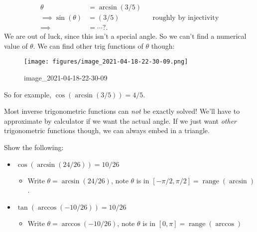 \begin{solution}

\begin{align*}
\theta &= \arcsin(3/5) \\
\implies \sin(\theta) &= (3/5) && \text{roughly by injectivity} \\
\implies &= \cdots ?
.\end{align*}
We are out of luck, since this isn't a special angle. So we can't find a
numerical value of \(\theta\). We can find other trig functions of
\(\theta\) though:

\begin{figure}
\centering
\texttt{[image: figures/image\_2021-04-18-22-30-09.png]}
\caption{image\_2021-04-18-22-30-09}
\end{figure}

So for example, \(\cos(\arcsin(3/5)) = 4/5\).

\end{solution}

\begin{remark}

Most inverse trigonometric functions can \emph{not} be exactly solved!
We'll have to approximate by calculator if we want the actual angle. If
we just want \emph{other} trigonometric functions though, we can always
embed in a triangle.

\end{remark}

\begin{example}

Show the following:

\begin{itemize}
\tightlist
\item
  \(\cos(\arcsin(24/26)) = 10/26\)

  \begin{itemize}
  \tightlist
  \item
    Write \(\theta = \arcsin(24/26)\), note \(\theta\) is in
    \([-\pi/2, \pi/2] = \mathop{\mathrm{range}}(\arcsin)\).
  \end{itemize}
\item
  \(\tan(\arccos(-10/26)) = 10/26\)

  \begin{itemize}
  \tightlist
  \item
    Write \(\theta = \arccos(-10/26)\), note \(\theta\) is in
    \([0, \pi] = \mathop{\mathrm{range}}(\arccos)\)
  \end{itemize}
\end{itemize}

\end{example}

